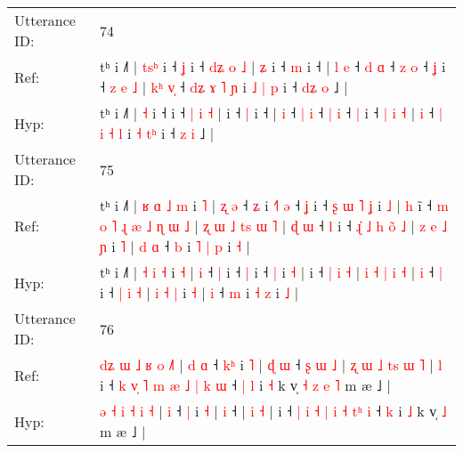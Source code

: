 \documentclass[10pt]{article}
\DeclareRobustCommand{\hl}[1]{{\textcolor{red}{#1}}}
\begin{document}
\begin{longtable}{ll}
\midrule
Utterance ID: & 74 \\
Ref: & tʰ i ˩˥ | \hl{t}\hl{s}\hl{ʰ} i ˧\hl{ }\hl{ʝ} i ˧ \hl{d}\hl{ʑ} \hl{o} \hl{˩} |\hl{ }\hl{ʑ} i ˧ \hl{m} i ˧ |\hl{ }\hl{l} \hl{e} ˧ \hl{d} \hl{ɑ} ˧ \hl{z} \hl{o} ˧ \hl{ʝ} i ˧ \hl{z} \hl{e} \hl{˩} |\hl{ }\hl{k}\hl{ʰ} \hl{v}\hl{̩} ˧ \hl{d}\hl{ʑ} \hl{ɤ} \hl{˥} \hl{ɲ} i \hl{˩} \hl{|}\hl{ }\hl{p} i ˧ \hl{d}\hl{ʑ} \hl{o} ˩ |
 \\
Hyp: & tʰ i ˩˥ | \hl{}\hl{}\hl{˧} i ˧\hl{}\hl{} i ˧ \hl{}\hl{|} \hl{i} \hl{˧} |\hl{}\hl{} i ˧ \hl{|} i ˧ |\hl{}\hl{} \hl{i} ˧ \hl{|} \hl{i} ˧ \hl{|} \hl{i} ˧ \hl{|} i ˧ \hl{|} \hl{i} \hl{˧} |\hl{}\hl{}\hl{} \hl{}\hl{i} ˧ \hl{}\hl{|} \hl{i} \hl{˧} \hl{l} i \hl{˧} \hl{}\hl{t}\hl{ʰ} i ˧ \hl{}\hl{z} \hl{i} ˩ |
 \\
\midrule
Utterance ID: & 75 \\
Ref: & tʰ i ˩˥ |\hl{ }\hl{ʁ} \hl{ɑ} \hl{˩} \hl{m} i \hl{˥} |\hl{ }\hl{ʐ} \hl{ə} ˧ \hl{ʑ} i\hl{ }\hl{˧}\hl{˥}\hl{ }\hl{ə} ˧ \hl{ʝ} i ˧\hl{ }\hl{ʂ}\hl{ }\hl{ɯ}\hl{ }\hl{˥} \hl{ʝ} i \hl{˩} |\hl{ }\hl{h} i\hl{̃} ˧\hl{ }\hl{m}\hl{ }\hl{o}\hl{ }\hl{˥}\hl{ }\hl{ɻ}\hl{ }\hl{æ}\hl{ }\hl{˩} \hl{ɳ} \hl{ɯ} \hl{˩} |\hl{ }\hl{ʐ} \hl{ɯ} \hl{˩} \hl{t}\hl{s} \hl{ɯ} \hl{˥} |\hl{ }\hl{ɖ} \hl{ɯ} ˧ \hl{l} i ˧\hl{ }\hl{ɻ}\hl{̍}\hl{ }\hl{˩} \hl{h} \hl{o}\hl{̃} \hl{˩} |\hl{ }\hl{z} \hl{e} \hl{˩} \hl{ɲ} i \hl{˥} |\hl{ }\hl{d} \hl{ɑ} ˧ \hl{b} i\hl{ }\hl{˥} \hl{|} \hl{p} i \hl{˧} |
 \\
Hyp: & tʰ i ˩˥ |\hl{}\hl{} \hl{˧} \hl{i} \hl{˧} i \hl{˧} |\hl{}\hl{} \hl{i} ˧ \hl{|} i\hl{}\hl{}\hl{}\hl{}\hl{} ˧ \hl{|} i ˧\hl{}\hl{}\hl{}\hl{}\hl{}\hl{} \hl{|} i \hl{˧} |\hl{}\hl{} i\hl{} ˧\hl{}\hl{}\hl{}\hl{}\hl{}\hl{}\hl{}\hl{}\hl{}\hl{}\hl{}\hl{} \hl{|} \hl{i} \hl{˧} |\hl{}\hl{} \hl{i} \hl{˧} \hl{}\hl{|} \hl{i} \hl{˧} |\hl{}\hl{} \hl{i} ˧ \hl{|} i ˧\hl{}\hl{}\hl{}\hl{}\hl{} \hl{|} \hl{}\hl{i} \hl{˧} |\hl{}\hl{} \hl{i} \hl{˧} \hl{|} i \hl{˧} |\hl{}\hl{} \hl{i} ˧ \hl{m} i\hl{}\hl{} \hl{˧} \hl{z} i \hl{˩} |
 \\
\midrule
Utterance ID: & 76 \\
Ref: & \hl{d}\hl{ʑ} \hl{ɯ} \hl{˩} \hl{ʁ} \hl{o} \hl{˩}\hl{˥} |\hl{ }\hl{d} \hl{ɑ} ˧ \hl{k}\hl{ʰ} i \hl{˥} |\hl{ }\hl{ɖ} \hl{ɯ} ˧\hl{ }\hl{ʂ}\hl{ }\hl{ɯ}\hl{ }\hl{˩} |\hl{ }\hl{ʐ}\hl{ }\hl{ɯ}\hl{ }\hl{˩}\hl{ }\hl{t}\hl{s} \hl{ɯ} \hl{˥} |\hl{ }\hl{l} i ˧ \hl{k} \hl{v}\hl{̩} \hl{˥} \hl{m} \hl{æ} \hl{˩} \hl{|}\hl{ }\hl{k} \hl{ɯ} ˧\hl{ }\hl{|} \hl{l} i \hl{˧} k v̩\hl{ }\hl{˧}\hl{ }\hl{z}\hl{ }\hl{e} \hl{˥} m æ ˩ |
 \\
Hyp: & \hl{}\hl{ə} \hl{˧} \hl{i} \hl{˧} \hl{i} \hl{}\hl{˧} |\hl{}\hl{} \hl{i} ˧ \hl{}\hl{|} i \hl{˧} |\hl{}\hl{} \hl{i} ˧\hl{}\hl{}\hl{}\hl{}\hl{}\hl{} |\hl{}\hl{}\hl{}\hl{}\hl{}\hl{}\hl{}\hl{}\hl{} \hl{i} \hl{˧} |\hl{}\hl{} i ˧ \hl{|} \hl{}\hl{i} \hl{˧} \hl{|} \hl{i} \hl{˧} \hl{}\hl{t}\hl{ʰ} \hl{i} ˧\hl{}\hl{} \hl{k} i \hl{˩} k v̩\hl{}\hl{}\hl{}\hl{}\hl{}\hl{} \hl{˩} m æ ˩ |

\end{longtable}
\end{document}

